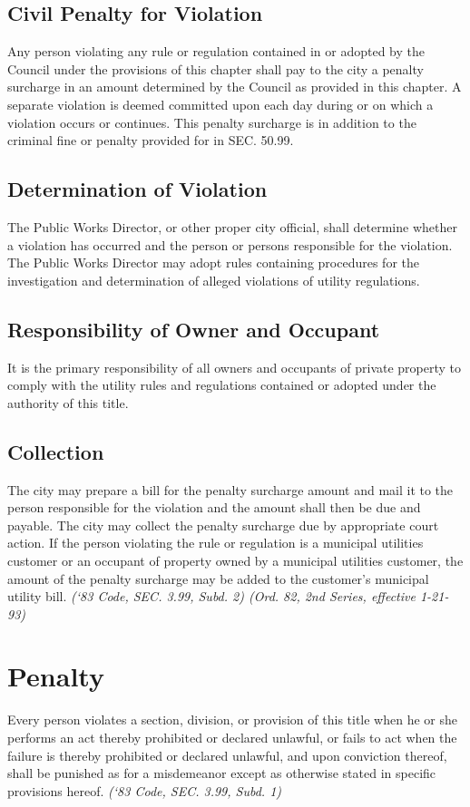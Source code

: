 \documentclass[code.tex]{subfiles}
\begin{document}
\subsection{Civil Penalty for Violation}
Any person violating any rule or regulation contained in or adopted by the Council under the provisions of this chapter shall pay to the city a penalty surcharge in an amount determined by the Council as provided in this chapter.  A separate violation is deemed committed upon each day during or on which a violation occurs or continues.  This penalty surcharge is in addition to the criminal fine or penalty provided for in SEC. 50.99.
\subsection{Determination of Violation}
The Public Works Director, or other proper city official, shall determine whether a violation has occurred and the person or persons responsible for the violation.  The Public Works Director may adopt rules containing procedures for the investigation and determination of alleged violations of utility regulations.
\subsection{Responsibility of Owner and Occupant}
It is the primary responsibility of all owners and occupants of private property to comply with the utility rules and regulations contained or adopted under the authority of this title.
\subsection{Collection}
The city may prepare a bill for the penalty surcharge amount and mail it to the person responsible for the violation and the amount shall then be due and payable.  The city may collect the penalty surcharge due by appropriate court action.  If the person violating the rule or regulation is a municipal utilities customer or an occupant of property owned by a municipal utilities customer, the amount of the penalty surcharge may be added to the customer’s municipal utility bill.\newline
\emph{(‘83 Code, SEC. 3.99, Subd. 2) (Ord. 82, 2nd Series, effective 1-21-93)}
\section{Penalty}
Every person violates a section, division, or provision of this title when he or she performs an act thereby prohibited or declared unlawful, or fails to act when the failure is thereby prohibited or declared unlawful, and upon conviction thereof, shall be punished as for a misdemeanor except as otherwise stated in specific provisions hereof.\newline
\emph{(‘83 Code, SEC. 3.99, Subd. 1)}
\end{document}

